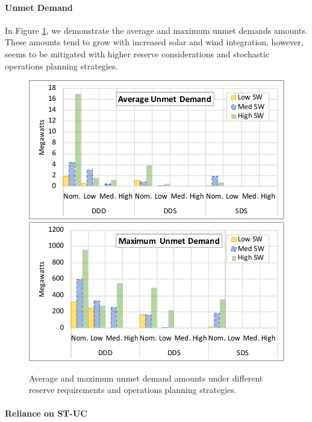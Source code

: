 \paragraph{Unmet Demand} In Figure \ref{sec:experiments:fig:unmet_demand}, we demonstrate the average and maximum unmet demands amounts. These amounts tend to grow with increased solar and wind integration, however, seems to be mitigated with higher reserve considerations and stochastic operations planning strategies.  
\begin{figure}[h!]
\centering
\includegraphics[trim={5mm 2mm 3mm 2mm}, clip, scale=.6]{./figures/avg_unmet_demand.pdf}
\hspace{5mm}
\includegraphics[trim={5mm 2mm 3mm 2mm}, clip, scale=.6]{./figures/max_unmet_demand.pdf}
\caption{Average and maximum unmet demand amounts under different reserve requirements and operations planning strategies.}
\label{sec:experiments:fig:unmet_demand}
\end{figure}

\paragraph{Reliance on ST-UC} 


